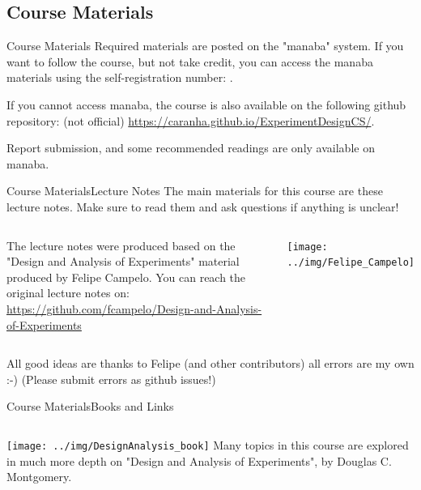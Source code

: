 \documentclass[aspectratio=169]{beamer}
\begin{document}
\begin{CJK}{UTF8}{ipxm}

\subsection{Course Materials}
\begin{frame}{Course Materials}
  Required materials are posted on the "manaba" system. If you want to follow the course, but not take credit, you can access the manaba materials using the self-registration number: .
  \bigskip

  If you cannot access manaba, the course is also available on the following github repository: (not official) \url{https://caranha.github.io/ExperimentDesignCS/}.
  \bigskip

  Report submission, and some recommended readings are only available on manaba.
\end{frame}

\begin{frame}{Course Materials}{Lecture Notes}
  The main materials for this course are these lecture notes.
  Make sure to read them and ask questions if anything is unclear!
  \bigskip

  \begin{columns}
    The lecture notes were produced based on the "Design and Analysis of Experiments" material produced by Felipe Campelo. You can reach the original lecture notes on: \url{https://github.com/fcampelo/Design-and-Analysis-of-Experiments}

    \hfill\texttt{[image: ../img/Felipe\_Campelo]}
  \end{columns}
  \bigskip

  All good ideas are thanks to Felipe (and other contributors) all errors are my own :-) (Please submit errors as github issues!)
\end{frame}

\begin{frame}{Course Materials}{Books and Links}
  \begin{columns}
    \texttt{[image: ../img/DesignAnalysis\_book]}
    Many topics in this course are explored in much more depth on "Design and Analysis of Experiments", by Douglas C. Montgomery.
  \end{columns}
  \vspace{1cm}


\end{frame}
\end{CJK}
\end{document}
